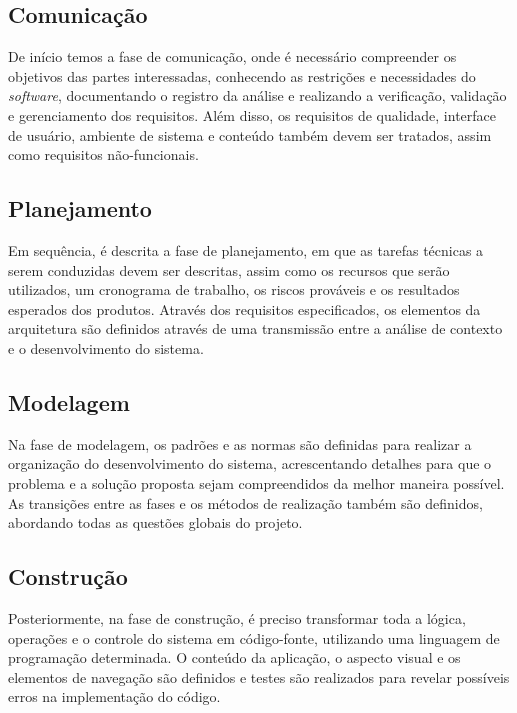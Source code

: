 \subsection{Comunicação}
\label{sec-ref-comunicacao}

De início temos a fase de comunicação, onde é necessário compreender os objetivos das partes interessadas, conhecendo as restrições e necessidades do \textit{software}, documentando o registro da análise e realizando a verificação, validação e gerenciamento dos requisitos. Além disso, os requisitos de qualidade, interface de usuário, ambiente de sistema e conteúdo também devem ser tratados, assim como requisitos não-funcionais.

\subsection{Planejamento}
\label{sec-ref-planejamento}

Em sequência, é descrita a fase de planejamento, em que as tarefas técnicas a serem conduzidas devem ser descritas, assim como os recursos que serão utilizados, um cronograma de trabalho, os riscos prováveis e os resultados esperados dos produtos. Através dos requisitos especificados, os elementos da arquitetura são definidos através de uma transmissão entre a análise de contexto e o desenvolvimento do sistema.

\subsection{Modelagem}
\label{sec-ref-modelagem}

Na fase de modelagem, os padrões e as normas são definidas para realizar a organização do desenvolvimento do sistema, acrescentando detalhes para que o problema e a solução proposta sejam compreendidos da melhor maneira possível. As transições entre as fases e os métodos de realização também são definidos, abordando todas as questões globais do projeto.   

\subsection{Construção}
\label{sec-ref-construcao}

Posteriormente, na fase de construção, é preciso transformar toda a lógica, operações e o controle do sistema em código-fonte, utilizando uma linguagem de programação determinada. O conteúdo da aplicação, o aspecto visual e os elementos de navegação são definidos e testes são realizados para revelar possíveis erros na implementação do código. 

